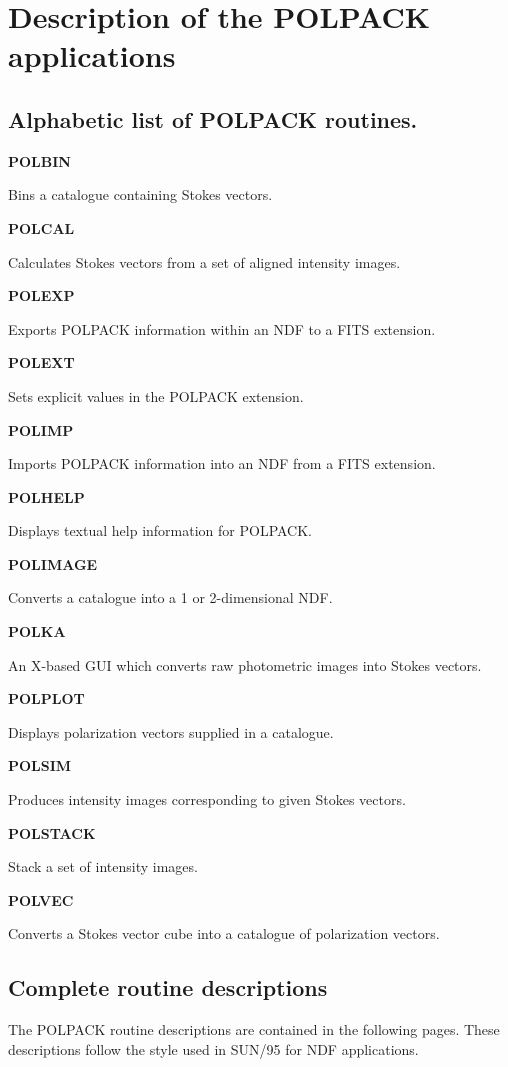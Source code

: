 \documentclass[twoside,11pt]{article}
\newenvironment{latexonly}{}{}
\newcommand{\xref}[3]{#1}
\renewcommand{\_}{\texttt{\symbol{95}}}
\newcommand{\quickdes}[3]{
                         \parbox{1.1in}{\bf #1}
                         \parbox{4.4in}{\raggedright #2 \dotfill}
                         \parbox{0.6in}{\pageref{#3}}
                         \vspace*{0.2in}}
\newcommand{\latexonlysubsection}[1]{\subsection{#1}}
\newcommand{\latexonlysubsection}[1]{#1}
\begin{document}
\section{ \label{APP:DESCRIPTION}Description of the POLPACK applications}
\begin{latexonly}
\latexonlysubsection{Alphabetic list of POLPACK routines.}
%
%
\quickdes{POLBIN}{Bins a catalogue containing Stokes vectors.}{ POLBIN }

\quickdes{POLCAL}{Calculates Stokes vectors from a set of aligned intensity images.}{ POLCAL }

\quickdes{POLEXP}{Exports POLPACK information within an NDF to a FITS extension.}{ POLEXP }

\quickdes{POLEXT}{Sets explicit values in the POLPACK extension.}{ POLEXT }

\quickdes{POLIMP}{Imports POLPACK information into an NDF from a FITS
extension.}{ POLEXP }

\quickdes{POLHELP}{Displays textual help information for POLPACK.}{
POLHELP }

\quickdes{POLIMAGE}{Converts a catalogue into a 1 or 2-dimensional NDF.}
{ POLIMAGE }

\quickdes{POLKA}{An X-based GUI which converts raw photometric images
into Stokes vectors.}{ POLKA }

\quickdes{POLPLOT}{Displays polarization vectors supplied in a
catalogue.}{ POLPLOT }

\quickdes{POLSIM}{Produces intensity images corresponding to given Stokes
vectors.}{ POLSIM }

\quickdes{POLSTACK}{Stack a set of intensity images.}{ POLSTACK }

\quickdes{POLVEC}{Converts a Stokes vector cube into a catalogue of
polarization vectors.}{ POLVEC }

\end{latexonly}

\subsection{Complete routine descriptions \label{descriptions}}

The POLPACK routine descriptions are contained in the following pages.
These descriptions follow the style used in \xref{SUN/95}{sun95}{ap_full}
for NDF applications.
\end{document}
